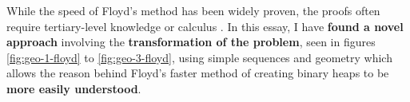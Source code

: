 \documentclass[12pt]{article}
\begin{document}
While the speed of Floyd's method has been widely proven, the proofs often require tertiary-level knowledge or calculus \parencites[17]{washu_floyd_proof}[27-28]{skiena_lecture}. In this essay, I have \textbf{found a novel approach} involving the \textbf{transformation of the problem}, seen in figures \ref{fig:geo-1-floyd} to \ref{fig:geo-3-floyd}, using simple sequences and geometry which allows the reason behind Floyd's faster method of creating binary heaps to be \textbf{more easily understood}.

\raggedright
\newpage
\printbibliography[
heading=bibnumbered,
title={Bibliography}
]
\end{document}
